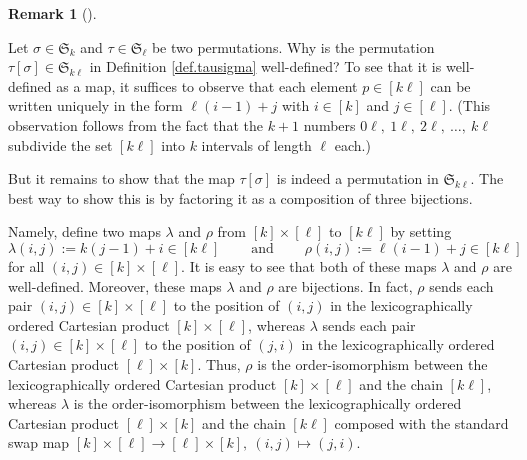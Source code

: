 \documentclass[numbers=enddot,12pt,final,onecolumn,notitlepage]{scrartcl}%
\theoremstyle{definition}
\newtheorem{remk}[theo]{Remark}
\newenvironment{remark}[1][]
{\begin{remk}[#1]\begin{leftbar}}
{\end{leftbar}\end{remk}}
\begin{document}
\begin{remark}
\label{rmk.tausigma.wd}Let $\sigma\in\mathfrak{S}_{k}$ and $\tau
\in\mathfrak{S}_{\ell}$ be two permutations. Why is the permutation
$\tau\left[  \sigma\right]  \in\mathfrak{S}_{k\ell}$ in Definition
\ref{def.tausigma} well-defined? To see that it is well-defined as a map, it
suffices to observe that each element $p\in\left[  k\ell\right]  $ can be
written uniquely in the form $\ell\left(  i-1\right)  +j$ with $i\in\left[
k\right]  $ and $j\in\left[  \ell\right]  $. (This observation follows from
the fact that the $k+1$ numbers $0\ell,\ 1\ell,\ 2\ell,\ \ldots,\ k\ell$
subdivide the set $\left[  k\ell\right]  $ into $k$ intervals of length $\ell$ each.)

But it remains to show that the map $\tau\left[  \sigma\right]  $ is indeed a
permutation in $\mathfrak{S}_{k\ell}$. The best way to show this is by
factoring it as a composition of three bijections.

Namely, define two maps $\lambda$ and $\rho$ from $\left[  k\right]
\times\left[  \ell\right]  $ to $\left[  k\ell\right]  $ by setting%
\[
\lambda\left(  i,j\right)  :=k\left(  j-1\right)  +i\in\left[  k\ell\right]
\ \ \ \ \ \ \ \ \ \ \text{and}\ \ \ \ \ \ \ \ \ \ \rho\left(  i,j\right)
:=\ell\left(  i-1\right)  +j\in\left[  k\ell\right]
\]
for all $\left(  i,j\right)  \in\left[  k\right]  \times\left[  \ell\right]
$. It is easy to see that both of these maps $\lambda$ and $\rho$ are
well-defined. Moreover, these maps $\lambda$ and $\rho$ are bijections. In
fact, $\rho$ sends each pair $\left(  i,j\right)  \in\left[  k\right]
\times\left[  \ell\right]  $ to the position of $\left(  i,j\right)  $ in the
lexicographically ordered Cartesian product $\left[  k\right]  \times\left[
\ell\right]  $, whereas $\lambda$ sends each pair $\left(  i,j\right)
\in\left[  k\right]  \times\left[  \ell\right]  $ to the position of $\left(
j,i\right)  $ in the lexicographically ordered Cartesian product $\left[
\ell\right]  \times\left[  k\right]  $. Thus, $\rho$ is the order-isomorphism
between the lexicographically ordered Cartesian product $\left[  k\right]
\times\left[  \ell\right]  $ and the chain $\left[  k\ell\right]  $, whereas
$\lambda$ is the order-isomorphism between the lexicographically ordered
Cartesian product $\left[  \ell\right]  \times\left[  k\right]  $ and the
chain $\left[  k\ell\right]  $ composed with the standard swap map $\left[
k\right]  \times\left[  \ell\right]  \rightarrow\left[  \ell\right]
\times\left[  k\right]  ,\ \left(  i,j\right)  \mapsto\left(  j,i\right)  $.


\end{remark}
\end{document}
